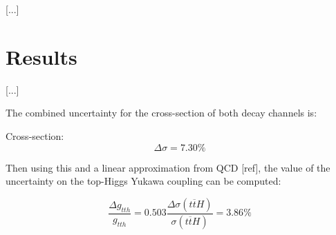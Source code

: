 %

[...]

\section{Results}
[...] 

The combined uncertainty for the cross-section of both decay channels is:

Cross-section: $$\Delta\sigma = 7.30\% $$

Then using this and a linear approximation from \acrshort{QCD} [ref], the value of the uncertainty on the top-Higgs Yukawa coupling can be computed:

$$\frac{\Delta g_{tth}}{g_{tth}} = 0.503 \frac{\Delta\sigma(t\overline{t}H)}{\sigma(t\overline{t}H)} = 3.86\% $$

